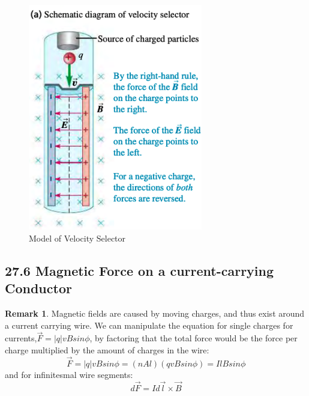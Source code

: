 \documentclass[12pt]{amsart}
\theoremstyle{definition}
\newtheorem*{remark}{Remark}        %
\numberwithin{equation}{theorem}    %
\begin{document}
\begin{figure}[H]
    \centering
    \includegraphics[width=3in]{Media/Velsec.png}
    \caption{Model of Velocity Selector}
    \label{Model of Velocity Selector}
\end{figure}

\subsection*{27.6 Magnetic Force on a current-carrying Conductor}

\begin{remark}
    Magnetic fields are caused by moving charges, and thus exist around a current
    carrying wire. We can manipulate the equation for single charges for currents,$\vec{F}=|q|vBsin\phi$, by factoring that the total force would be the force per charge multiplied by the amount of charges in the wire:
    $$\vec{F}=|q|vBsin\phi = (nAl)(qvBsin\phi) = IlBsin\phi$$ 
    and for infinitesmal wire segments: 
    $$d\vec{F} = Id\vec{l} \times \vec{B}$$
\end{remark}
\end{document}
